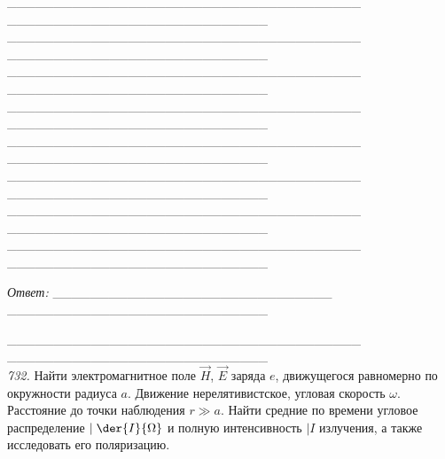\begin{enumerate}
    \_\_\_\_\_\_\_\_\_\_\_\_\_\_\_\_\_\_\_\_\_\_\_\_\_\_\_\_\_\_\_\_\_\_\_\_\_\_
    \!\!\_\_\_\_\_\_\_\_\_\_\_\_\_\_\_\_\_\_\_\_\_\_\_\_\_\_\_\_\\
    \_\_\_\_\_\_\_\_\_\_\_\_\_\_\_\_\_\_\_\_\_\_\_\_\_\_\_\_\_\_\_\_\_\_\_\_\_\_
    \!\!\_\_\_\_\_\_\_\_\_\_\_\_\_\_\_\_\_\_\_\_\_\_\_\_\_\_\_\_\\
    \_\_\_\_\_\_\_\_\_\_\_\_\_\_\_\_\_\_\_\_\_\_\_\_\_\_\_\_\_\_\_\_\_\_\_\_\_\_
    \!\!\_\_\_\_\_\_\_\_\_\_\_\_\_\_\_\_\_\_\_\_\_\_\_\_\_\_\_\_\\
    \_\_\_\_\_\_\_\_\_\_\_\_\_\_\_\_\_\_\_\_\_\_\_\_\_\_\_\_\_\_\_\_\_\_\_\_\_\_
    \!\!\_\_\_\_\_\_\_\_\_\_\_\_\_\_\_\_\_\_\_\_\_\_\_\_\_\_\_\_\\
    \_\_\_\_\_\_\_\_\_\_\_\_\_\_\_\_\_\_\_\_\_\_\_\_\_\_\_\_\_\_\_\_\_\_\_\_\_\_
    \!\!\_\_\_\_\_\_\_\_\_\_\_\_\_\_\_\_\_\_\_\_\_\_\_\_\_\_\_\_\\
    \_\_\_\_\_\_\_\_\_\_\_\_\_\_\_\_\_\_\_\_\_\_\_\_\_\_\_\_\_\_\_\_\_\_\_\_\_\_
    \!\!\_\_\_\_\_\_\_\_\_\_\_\_\_\_\_\_\_\_\_\_\_\_\_\_\_\_\_\_\\
    \_\_\_\_\_\_\_\_\_\_\_\_\_\_\_\_\_\_\_\_\_\_\_\_\_\_\_\_\_\_\_\_\_\_\_\_\_\_
    \!\!\_\_\_\_\_\_\_\_\_\_\_\_\_\_\_\_\_\_\_\_\_\_\_\_\_\_\_\_\\
    \_\_\_\_\_\_\_\_\_\_\_\_\_\_\_\_\_\_\_\_\_\_\_\_\_\_\_\_\_\_\_\_\_\_\_\_\_\_
    \!\!\_\_\_\_\_\_\_\_\_\_\_\_\_\_\_\_\_\_\_\_\_\_\_\_\_\_\_\_\\
\end{enumerate}

\vspace*{2em}
\emph{Ответ:}
    \_\_\_\_\_\_\_\_\_\_\_\_\_\_\_\_\_\_\_\_\_\_\_\_\_\_\_\_\_\_
    \!\!\_\_\_\_\_\_\_\_\_\_\_\_\_\_\_\_\_\_\_\_\_\_\_\_\_\_\_\_
      
    \_\_\_\_\_\_\_\_\_\_\_\_\_\_\_\_\_\_\_\_\_\_\_\_\_\_\_\_\_\_\_\_\_\_\_\_\_\_
    \!\!\_\_\_\_\_\_\_\_\_\_\_\_\_\_\_\_\_\_\_\_\_\_\_\_\_\_\_\_\\
    
\newpage
\emph{732.} Найти электромагнитное поле \( \vec{H} \), \( \vec{E} \) заряда
\( e \), движущегося равномерно по окружности радиуса \( a \). Движение
нерелятивистское, угловая скорость \( \omega \). Расстояние до точки наблюдения
\( r \gg a \). Найти средние по времени угловое распределение \( \ds
\mid{\der{I}{\Omega}} \) и полную интенсивность \( \mid{I} \) излучения, а также
исследовать его поляризацию.


